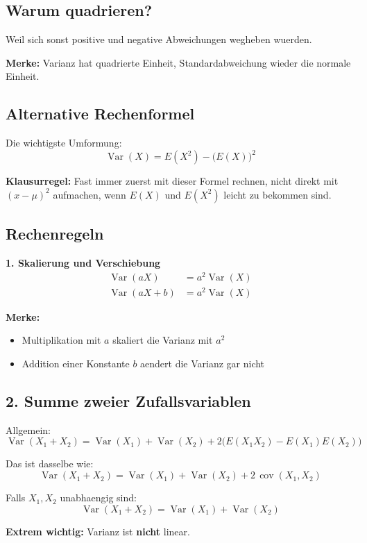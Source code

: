 \documentclass[a4paper,11pt]{article}
\begin{document}
\subsection{Warum quadrieren?}
Weil sich sonst positive und negative Abweichungen wegheben wuerden.

\textbf{Merke:}
Varianz hat quadrierte Einheit, Standardabweichung wieder die normale Einheit.

\subsection{Alternative Rechenformel}
Die wichtigste Umformung:
\[
\operatorname{Var}(X)=E(X^2)-\big(E(X)\big)^2
\]

\textbf{Klausurregel:}
Fast immer zuerst mit dieser Formel rechnen, nicht direkt mit $(x-\mu)^2$ aufmachen, wenn $E(X)$ und $E(X^2)$ leicht zu bekommen sind.

\subsection{Rechenregeln}
\textbf{1. Skalierung und Verschiebung}
\begin{align*}
\operatorname{Var}(aX) &= a^2 \operatorname{Var}(X) \\
\operatorname{Var}(aX+b) &= a^2 \operatorname{Var}(X)
\end{align*}

\textbf{Merke:}
\begin{itemize}
  \item Multiplikation mit $a$ skaliert die Varianz mit $a^2$
  \item Addition einer Konstante $b$ aendert die Varianz gar nicht
\end{itemize}

\subsection{2. Summe zweier Zufallsvariablen}
Allgemein:
\[
\operatorname{Var}(X_1+X_2)
=\operatorname{Var}(X_1)+\operatorname{Var}(X_2)+2\big(E(X_1X_2)-E(X_1)E(X_2)\big)
\]

Das ist dasselbe wie:
\[
\operatorname{Var}(X_1+X_2)
=\operatorname{Var}(X_1)+\operatorname{Var}(X_2)+2\,\operatorname{cov}(X_1,X_2)
\]

Falls $X_1,X_2$ unabhaengig sind:
\[
\operatorname{Var}(X_1+X_2)=\operatorname{Var}(X_1)+\operatorname{Var}(X_2)
\]

\textbf{Extrem wichtig:}
Varianz ist \textbf{nicht} linear.
\end{document}
